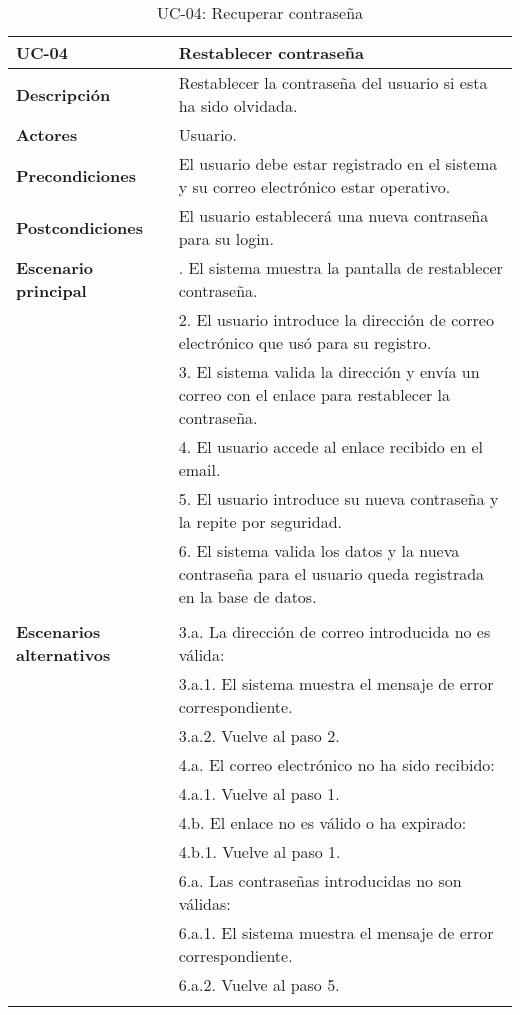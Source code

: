 \begin{table}[H]
  \begin{center}
    \begin{tabularx}{16.4cm}{|l|X|}
      \hline
      \textbf{UC-04} & \textbf{Restablecer contraseña}\\
      \hline
      \textbf{Descripción} & Restablecer la contraseña del usuario si esta ha sido olvidada.\\
      \hline
      \textbf{Actores} & Usuario.\\
      \hline
      \textbf{Precondiciones} & El usuario debe estar registrado en el sistema y su correo electrónico estar operativo.\\
      \hline
      \textbf{Postcondiciones} & El usuario establecerá una nueva contraseña para su login.\\
      \hline
      \textbf{Escenario principal} & \smallskip 1. El sistema muestra la pantalla de restablecer contraseña. \\
      & 2. El usuario introduce la dirección de correo electrónico que usó para su registro.\\
      & 3. El sistema valida la dirección y envía un correo con el enlace para restablecer la contraseña.\\
      & 4. El usuario accede al enlace recibido en el email.\\
      & 5. El usuario introduce su nueva contraseña y la repite por seguridad.\\
      & 6. El sistema valida los datos y la nueva contraseña para el usuario queda registrada en la base de datos.\\
      & \\
      \hline
      \textbf{Escenarios alternativos} & \smallskip  3.a. La dirección de correo introducida no es válida:\\
      & \hspace{0.3cm} 3.a.1. El sistema muestra el mensaje de error correspondiente.\\
      & \hspace{0.3cm} 3.a.2. Vuelve al paso 2.\\
      & 4.a. El correo electrónico no ha sido recibido:\\
      & \hspace{0.3cm} 4.a.1. Vuelve al paso 1.\\
      & 4.b. El enlace no es válido o ha expirado:\\
      & \hspace{0.3cm} 4.b.1. Vuelve al paso 1.\\
      & 6.a. Las contraseñas introducidas no son válidas:\\
      & \hspace{0.3cm} 6.a.1. El sistema muestra el mensaje de error correspondiente.\\
      & \hspace{0.3cm} 6.a.2. Vuelve al paso 5.\\
      & \\
      \hline
    \end{tabularx}
    \caption{UC-04: Recuperar contraseña}
  \end{center}
\end{table}


